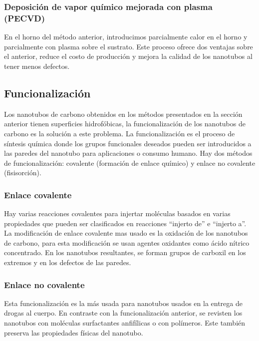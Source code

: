 \subsubsection{Deposición de vapor químico mejorada con plasma (PECVD)}

En el horno del método anterior, introducimos parcialmente calor en el horno y parcialmente con plasma sobre el sustrato. Este proceso ofrece dos ventajas sobre el anterior, reduce el costo de producción y mejora la calidad de los nanotubos al tener menos defectos.

\subsection{Funcionalización}

Los nanotubos de carbono obtenidos en los métodos presentados en la sección anterior tienen superficies hidrofóbicas, la funcionalización de los nanotubos de carbono es la solución a este problema. La funcionalización es el proceso de síntesis química donde los grupos funcionales deseados pueden ser introducidos a las paredes del nanotubo para aplicaciones o consumo humano. Hay dos métodos de funcionalización: covalente (formación de enlace químico) y enlace no covalente (fisisorción)\cite{KAUR2019}.

\subsubsection{Enlace covalente}

Hay varias reacciones covalentes para injertar moléculas basados en varias propiedades que pueden ser clasificados en reacciones ``injerto de'' e ``injerto a''. La modificación de enlace covalente mas usado es la oxidación de los nanotubos de carbono, para esta modificación se usan agentes oxidantes como ácido nítrico concentrado. En los nanotubos resultantes, se forman grupos de carboxil en los extremos y en los defectos de las paredes.

\subsubsection{Enlace no covalente}

Esta funcionalización es la más usada para nanotubos usados en la entrega de drogas al cuerpo. En contraste con la funcionalización anterior, se revisten los nanotubos con moléculas surfactantes anfifílicas o con polímeros. Este también preserva las propiedades físicas del nanotubo.



